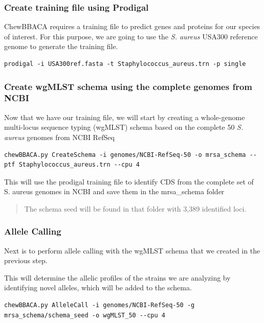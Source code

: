 \documentclass[
]{book}
\begin{document}
\subsubsection{Create training file using Prodigal}\label{create-training-file-using-prodigal}

ChewBBACA requires a training file to predict genes and proteins for our species of interest. For this purpose, we are going to use the \emph{S. aureus} USA300 reference genome to generate the training file.

\begin{verbatim}
prodigal -i USA300ref.fasta -t Staphylococcus_aureus.trn -p single
\end{verbatim}

\subsubsection{Create wgMLST schema using the complete genomes from NCBI}\label{create-wgmlst-schema-using-the-complete-genomes-from-ncbi}

Now that we have our training file, we will start by creating a whole-genome multi-locus sequence typing (wgMLST) schema based on the complete 50 \emph{S. aureus} genomes from NCBI RefSeq

\begin{verbatim}
chewBBACA.py CreateSchema -i genomes/NCBI-RefSeq-50 -o mrsa_schema --ptf Staphylococcus_aureus.trn --cpu 4
\end{verbatim}

This will use the prodigal training file to identify CDS from the complete set of S. aureus genomes in NCBI and save them in the mrsa\_schema folder

\begin{quote}
The schema seed will be found in that folder with 3,389 identified loci.
\end{quote}

\subsubsection{Allele Calling}\label{allele-calling}

Next is to perform allele calling with the wgMLST schema that we created in the previous step.

This will determine the allelic profiles of the strains we are analyzing by identifying novel alleles, which will be added to the schema.

\begin{verbatim}
chewBBACA.py AlleleCall -i genomes/NCBI-RefSeq-50 -g mrsa_schema/schema_seed -o wgMLST_50 --cpu 4
\end{verbatim}
\end{document}
